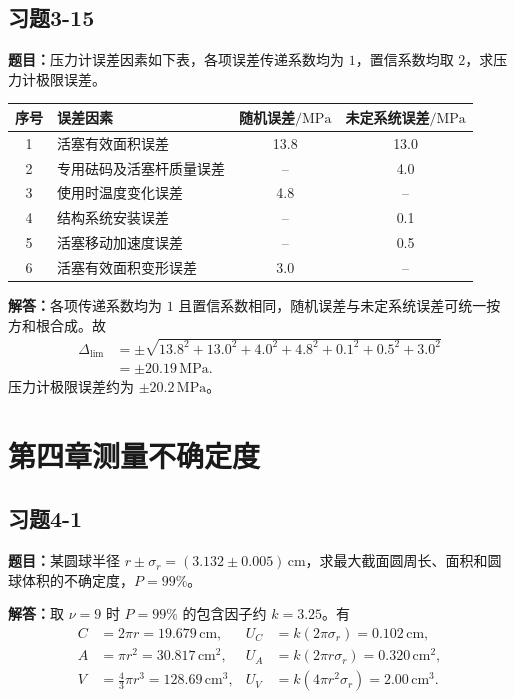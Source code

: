 \documentclass[UTF8,zihao=-4]{ctexart}
\newcommand{\problem}[1]{\subsection*{#1}}
\newcommand{\timu}{\noindent\textbf{题目：}}
\newcommand{\jieda}{\noindent\textbf{解答：}}
\begin{document}
{\problem{习题3-15}
\timu 压力计误差因素如下表，各项误差传递系数均为 $1$，置信系数均取 $2$，求压力计极限误差。

\begin{center}
\scriptsize
\setlength{\tabcolsep}{4pt}
\begin{tabular}{c|l|cc}
\toprule
序号 & 误差因素 & 随机误差$/\mathrm{MPa}$ & 未定系统误差$/\mathrm{MPa}$\\
\midrule
1 & 活塞有效面积误差 & 13.8 & 13.0\\
2 & 专用砝码及活塞杆质量误差 & -- & 4.0\\
3 & 使用时温度变化误差 & 4.8 & --\\
4 & 结构系统安装误差 & -- & 0.1\\
5 & 活塞移动加速度误差 & -- & 0.5\\
6 & 活塞有效面积变形误差 & 3.0 & --\\
\bottomrule
\end{tabular}
\end{center}

\jieda 各项传递系数均为 $1$ 且置信系数相同，随机误差与未定系统误差可统一按方和根合成。故
\begin{equation*}
\begin{aligned}
    \Delta_{\lim}
    &=\pm\sqrt{13.8^2+13.0^2+4.0^2+4.8^2+0.1^2+0.5^2+3.0^2}\\
    &=\pm20.19\,\mathrm{MPa}.
\end{aligned}
\end{equation*}
压力计极限误差约为 $\pm20.2\,\mathrm{MPa}$。

\section*{第四章\quad 测量不确定度}

\problem{习题4-1}
\timu 某圆球半径 $r\pm\sigma_r=(3.132\pm0.005)\,\mathrm{cm}$，求最大截面圆周长、面积和圆球体积的不确定度，$P=99\%$。

\jieda 取 $\nu=9$ 时 $P=99\%$ 的包含因子约 $k=3.25$。有
\begin{equation*}
\begin{aligned}
    C&=2\pi r=19.679\,\mathrm{cm},& U_C&=k(2\pi\sigma_r)=0.102\,\mathrm{cm},\\
    A&=\pi r^2=30.817\,\mathrm{cm^2},& U_A&=k(2\pi r\sigma_r)=0.320\,\mathrm{cm^2},\\
    V&=\frac{4}{3}\pi r^3=128.69\,\mathrm{cm^3},& U_V&=k(4\pi r^2\sigma_r)=2.00\,\mathrm{cm^3}.
\end{aligned}
\end{equation*}

}
\end{document}
